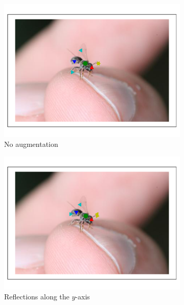 \documentclass[11pt, oneside]{report}
\begin{document}
        \begin{figure}[p]
            \centering
            \begin{subfigure}[b]{0.45\textwidth}
                \centering
                \includegraphics[width=\textwidth]{7p_2.pdf}
                \caption{No augmentation}
            \end{subfigure}
            \begin{subfigure}[b]{0.45\textwidth}
                \centering
                \includegraphics[width=\textwidth]{refl_2.pdf}
                \caption{Reflections along the $y$-axis}
            \end{subfigure}
            \begin{subfigure}[b]{0.45\textwidth}

\end{subfigure}
\end{figure}
\end{document}
